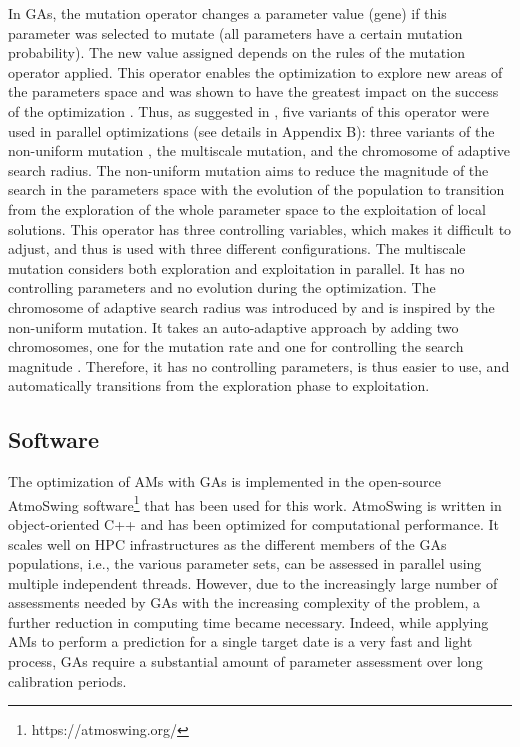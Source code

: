 \documentclass[draft]{agujournal2019}
\begin{document}
In GAs, the mutation operator changes a parameter value (gene) if this parameter was selected to mutate (all parameters have a certain mutation probability). The new value assigned depends on the rules of the mutation operator applied. This operator enables the optimization to explore new areas of the parameters space and was shown to have the greatest impact on the success of the optimization \cite{Horton2017a}. Thus, as suggested in , five variants of this operator were used in parallel optimizations (see details in Appendix B): three variants of the non-uniform mutation \cite{Michalewicz1996}, the multiscale mutation, and the chromosome of adaptive search radius. The non-uniform mutation aims to reduce the magnitude of the search in the parameters space with the evolution of the population to transition from the exploration of the whole parameter space to the exploitation of local solutions. This operator has three controlling variables, which makes it difficult to adjust, and thus is used with three different configurations. The multiscale mutation considers both exploration and exploitation in parallel. It has no controlling parameters and no evolution during the optimization. The chromosome of adaptive search radius was introduced by  and is inspired by the non-uniform mutation. It takes an auto-adaptive approach by adding two chromosomes, one for the mutation rate and one for controlling the search magnitude \cite<see details in>{Horton2017a}. Therefore, it has no controlling parameters, is thus easier to use, and automatically transitions from the exploration phase to exploitation.


\subsection{Software}
\label{software}

The optimization of AMs with GAs is implemented in the open-source AtmoSwing software\footnote{https://atmoswing.org/} \cite{Horton2019} that has been used for this work. AtmoSwing is written in object-oriented C++ and has been optimized for computational performance. It scales well on HPC infrastructures as the different members of the GAs populations, i.e., the various parameter sets, can be assessed in parallel using multiple independent threads. However, due to the increasingly large number of assessments needed by GAs with the increasing complexity of the problem, a further reduction in computing time became necessary. Indeed, while applying AMs to perform a prediction for a single target date is a very fast and light process, GAs require a substantial amount of parameter assessment over long calibration periods.
\end{document}
